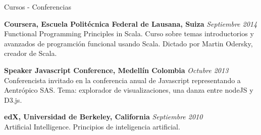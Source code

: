 \documentclass[spanish]{resume} %
\begin{document}
\begin{rSection}{Cursos - Conferencias}

{\bf Coursera, Escuela Polit\'ecnica Federal de Lausana, Suiza} \hfill {\em Septiembre 2014} \\ 
Functional Programming Principles in Scala.
Curso sobre temas introductorios y avanzados de programción funcional usando Scala.
Dictado por Martin Odersky, creador de Scala.

{\bf Speaker Javascript Conference, Medellín Colombia} \hfill {\em Octubre 2013} \\ 
Conferencista invitado en la conferencia anual de Javascript representando a Aentr\'opico SAS.
Tema: explorador de visualizaciones, una danza entre nodeJS y D3.js.

{\bf edX, Universidad de Berkeley, California} \hfill {\em Septiembre 2010} \\ 
Artificial Intelligence.
Principios de inteligencia artificial.

\end{rSection}
\end{document}
